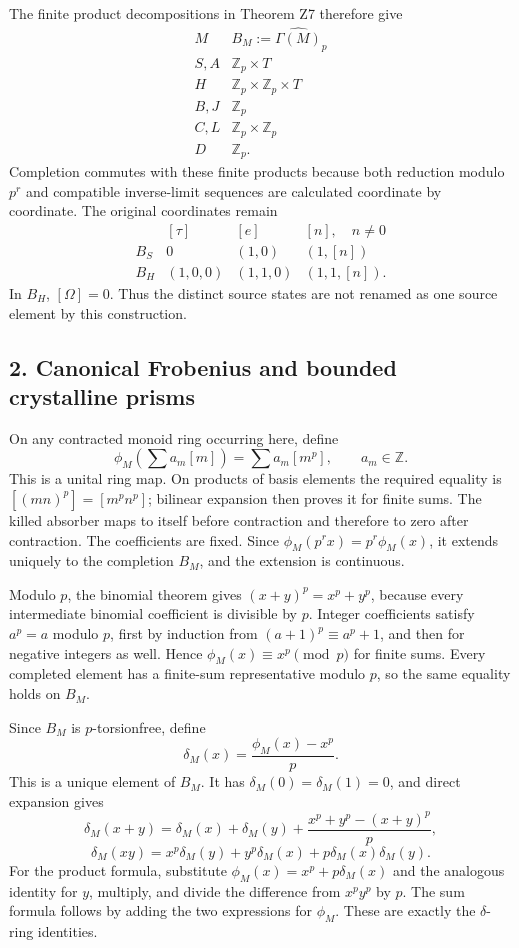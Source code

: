 \documentclass[
]{article}
\begin{document}
The finite product decompositions in Theorem Z7 therefore give \[
\begin{array}{c|c}
M&B_M:=\widehat{\Gamma(M)}_p\\\hline
S,A&\mathbb Z_p\times T\\
H&\mathbb Z_p\times\mathbb Z_p\times T\\
B,J&\mathbb Z_p\\
C,L&\mathbb Z_p\times\mathbb Z_p\\
D&\mathbb Z_p.
\end{array}
\tag{P2}
\] Completion commutes with these finite products because both reduction
modulo \(p^r\) and compatible inverse-limit sequences are calculated
coordinate by coordinate. The original coordinates remain \[
\begin{array}{c|ccc}
&[\tau]&[e]&[n],\quad n\ne0\\\hline
B_S&0&(1,0)&(1,[n])\\
B_H&(1,0,0)&(1,1,0)&(1,1,[n]).
\end{array}
\tag{P3}
\] In \(B_H\), \([\Omega]=0\). Thus the distinct source states are not
renamed as one source element by this construction.

\subsection{2. Canonical Frobenius and bounded crystalline
prisms}\label{canonical-frobenius-and-bounded-crystalline-prisms}

On any contracted monoid ring occurring here, define \[
\phi_M\left(\sum a_m[m]\right)=\sum a_m[m^p],
\qquad a_m\in\mathbb Z.
\tag{P4}
\] This is a unital ring map. On products of basis elements the required
equality is \([(mn)^p]=[m^pn^p]\); bilinear expansion then proves it for
finite sums. The killed absorber maps to itself before contraction and
therefore to zero after contraction. The coefficients are fixed. Since
\(\phi_M(p^rx)=p^r\phi_M(x)\), it extends uniquely to the completion
\(B_M\), and the extension is continuous.

Modulo \(p\), the binomial theorem gives \((x+y)^p=x^p+y^p\), because
every intermediate binomial coefficient is divisible by \(p\). Integer
coefficients satisfy \(a^p=a\) modulo \(p\), first by induction from
\((a+1)^p\equiv a^p+1\), and then for negative integers as well. Hence
\(\phi_M(x)\equiv x^p\pmod p\) for finite sums. Every completed element
has a finite-sum representative modulo \(p\), so the same equality holds
on \(B_M\).

Since \(B_M\) is \(p\)-torsionfree, define \[
\delta_M(x)=\frac{\phi_M(x)-x^p}{p}.
\tag{P5}
\] This is a unique element of \(B_M\). It has
\(\delta_M(0)=\delta_M(1)=0\), and direct expansion gives \[
\delta_M(x+y)=\delta_M(x)+\delta_M(y)
+\frac{x^p+y^p-(x+y)^p}{p},
\] \[
\delta_M(xy)=x^p\delta_M(y)+y^p\delta_M(x)
+p\delta_M(x)\delta_M(y).
\tag{P6}
\] For the product formula, substitute \(\phi_M(x)=x^p+p\delta_M(x)\)
and the analogous identity for \(y\), multiply, and divide the
difference from \(x^py^p\) by \(p\). The sum formula follows by adding
the two expressions for \(\phi_M\). These are exactly the
\(\delta\)-ring identities.
\end{document}

